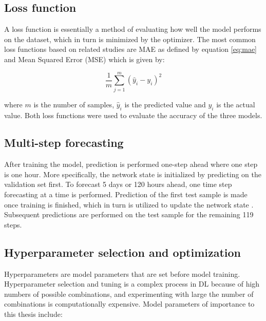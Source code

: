 \subsection{Loss function}
A loss function is essentially a method of evaluating how well the model performs on the dataset, which in turn is minimized by the optimizer. The most common loss functions based on related studies \cite{architechture1, QRA, arch2, stackedlstm} are MAE as defined by equation \ref{eq:mae} and Mean Squared Error (MSE) which is given by:

\begin{equation}
    {\frac{1}{m} \sum_{j=1}^m  {(\hat{y}_{i}-y_{i})}^2}
\end{equation}

where $m$ is the number of samples, $\hat{y}_{i}$ is the predicted value and $y_{i}$ is the actual value. Both loss functions were used to evaluate the accuracy of the three models. 

\subsection{Multi-step forecasting}
After training the model, prediction is performed one-step ahead where one step is one hour. More specifically, the network state is initialized by predicting on the validation set first. To forecast 5 days or 120 hours ahead, one time step forecasting at a time is performed. Prediction of the first test sample is made once training is finished, which in turn is utilized to update the network state \cite{zhang}. Subsequent predictions are performed on the test sample for the remaining 119 steps. 

\subsection{Hyperparameter selection and optimization}
Hyperparameters are model parameters that are set before model training. Hyperparameter selection and tuning is a complex process in DL because of high numbers of possible combinations, and experimenting with large the number of combinations is computationally expensive. Model parameters of importance to this thesis include:


